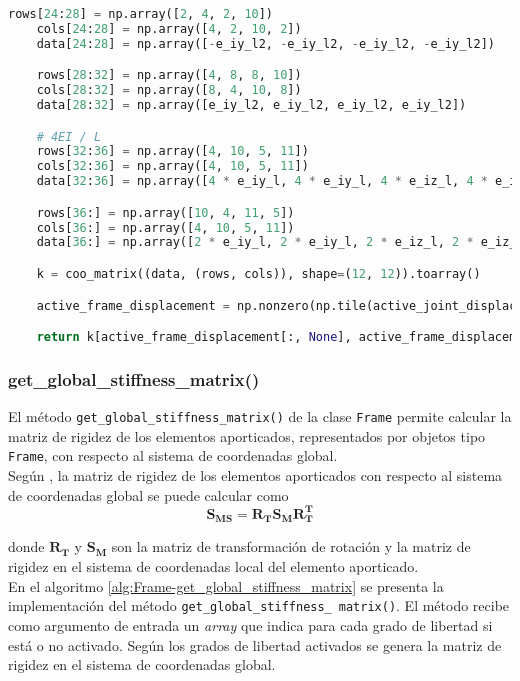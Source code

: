 \begin{lstlisting}[language=Python,caption=Método \texttt{get\_local\_stiffness\_matrix()} de la clase \texttt{Frame}.,label=alg:Frame-get_local_stiffness_matrix, frame=single]
    rows[24:28] = np.array([2, 4, 2, 10])
    cols[24:28] = np.array([4, 2, 10, 2])
    data[24:28] = np.array([-e_iy_l2, -e_iy_l2, -e_iy_l2, -e_iy_l2])

    rows[28:32] = np.array([4, 8, 8, 10])
    cols[28:32] = np.array([8, 4, 10, 8])
    data[28:32] = np.array([e_iy_l2, e_iy_l2, e_iy_l2, e_iy_l2])

    # 4EI / L
    rows[32:36] = np.array([4, 10, 5, 11])
    cols[32:36] = np.array([4, 10, 5, 11])
    data[32:36] = np.array([4 * e_iy_l, 4 * e_iy_l, 4 * e_iz_l, 4 * e_iz_l])

    rows[36:] = np.array([10, 4, 11, 5])
    cols[36:] = np.array([4, 10, 5, 11])
    data[36:] = np.array([2 * e_iy_l, 2 * e_iy_l, 2 * e_iz_l, 2 * e_iz_l])

    k = coo_matrix((data, (rows, cols)), shape=(12, 12)).toarray()

    active_frame_displacement = np.nonzero(np.tile(active_joint_displacements, 2))[0]

    return k[active_frame_displacement[:, None], active_frame_displacement]
\end{lstlisting}

\subsubsection{get\_global\_stiffness\_matrix()}

El método \verb|get_global_stiffness_matrix()| de la clase \verb|Frame| permite calcular la matriz de rigidez de los elementos aporticados, representados por objetos tipo \verb|Frame|, con respecto al sistema de coordenadas global.\\

Según \cite{weaver1990matrixanalysis}, la matriz de rigidez de los elementos aporticados con respecto al sistema de coordenadas global se puede calcular como
\begin{equation}
  \mathbf{S_{MS} = R_T S_M R_T^T}
  \label{eq:matriz-rigidez-global}
\end{equation}

donde $ \mathbf{R_T} $ y $ \mathbf{S_M} $ son la matriz de transformación de rotación y la matriz de rigidez en el sistema de coordenadas local del elemento aporticado.\\

En el algoritmo \ref{alg:Frame-get_global_stiffness_matrix} se presenta la implementación del método \verb|get_global_stiffness_|\ \verb|matrix()|. El método recibe como argumento de entrada un \emph{array} que indica para cada grado de libertad si está o no activado. Según los grados de libertad activados se genera la matriz de rigidez en el sistema de coordenadas global.\\

